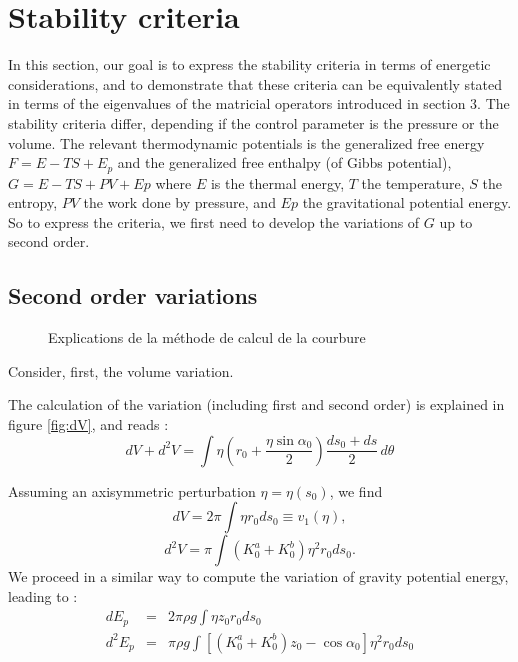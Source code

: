 \documentclass{jfm}
\newcommand\be{\begin{equation}}
\newcommand\ee{\end{equation}}
\begin{document}
\section{Stability criteria}

In this section, our goal is to express the stability criteria in terms of energetic considerations, and to demonstrate that these criteria can be equivalently stated in terms of the eigenvalues of the matricial operators introduced in section 3. The stability criteria differ, depending if the control parameter is the pressure or the volume. 
The relevant thermodynamic potentials is the generalized free energy $F = E-TS + E_p$ and the generalized free enthalpy (of Gibbs potential), $G = E - TS + PV + Ep$ where $E$ is the thermal energy, $T$ the temperature, $S$ the entropy, $PV$ the work done by pressure, and $Ep$ the gravitational potential energy. So to express the criteria, we first need to develop the variations of $G$ up to second order. 

\subsection{Second order variations}


\begin{figure}
\begin{center}

\end{center}
\caption{Explications de la méthode de calcul de la courbure}
\end{figure}


Consider, first, the volume variation. 

The calculation of the variation (including first and second order) is explained in figure \ref{fig:dV}, and reads :
\be 
dV + d^2 V = \int \eta \left( r_0+ \frac{\eta \sin \alpha_0}{2} \right) \frac{d s_0 + ds}{2} \, d \theta
\ee

Assuming an axisymmetric perturbation $\eta = \eta(s_0)$, we find 
\be 
d V = 2 \pi \int  \eta r_0 d s_0 \equiv v_1(\eta),
\ee
\be 
d^2 V = \pi \int \left(K_0^a + K_0^b \right) \eta^2 r_0 d s_0.
\ee
We proceed in a similar way to compute the variation of gravity potential energy, leading to :
\begin{eqnarray}
d E_p &=& 2  \pi \rho g \int  \eta z_0 r_0 d s_0 \\
d^2 E_p &=& \pi \rho g \int \left[ (K_0^a + K_0^b) z_0 - \cos \alpha_0 \right] \eta^2 r_0 d s_0 \\
\end{eqnarray}
\end{document}

